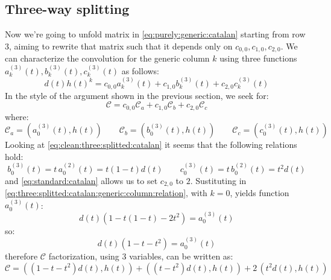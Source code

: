 \subsection{Three-way splitting}

Now we're going to unfold matrix in \autoref{eq:purely:generic:catalan} starting from row $3$,
aiming to rewrite that matrix such that it depends only on $c_{0,0}, c_{1,0}, c_{2,0}$.
We can characterize the convolution for the generic column $k$ using three
functions $a_{k}^{(3)}(t), b_{k}^{(3)}(t), c_{k}^{(3)}(t)$ as follows:
\begin{equation} 
    d(t)h(t)^{k} = c_{0,0}a_{k}^{(3)}(t) + c_{1,0}b_{k}^{(3)}(t) + c_{2,0}c_{k}^{(3)}(t)
    \label{eq:three:splitted:catalan:generic:column:relation}
\end{equation} 
In the style of the argument shown in the previous section, we seek for:
\begin{equation} 
    \mathcal{C} = c_{0,0}\mathcal{C}_{a} + c_{1,0}\mathcal{C}_{b} + c_{2,0}\mathcal{C}_{c}
    \label{eq:three:splitted:catalan:riordan:expansion}
\end{equation} 
where:
\begin{displaymath} 
    \mathcal{C}_{a} = \left(a_{0}^{(3)}(t), h(t)\right) \quad \quad 
    \mathcal{C}_{b} = \left(b_{0}^{(3)}(t), h(t)\right) \quad \quad 
    \mathcal{C}_{c} = \left(c_{0}^{(3)}(t), h(t)\right) \quad \quad 
\end{displaymath} 
Looking at \autoref{eq:clean:three:splitted:catalan} it seems that the following relations hold:
\begin{displaymath} 
    b_{0}^{(3)}(t) = t\,a_{0}^{(2)}(t) = t(1-t)d(t)\quad \quad 
    c_{0}^{(3)}(t) = t\,b_{0}^{(2)}(t) = t^{2}d(t) 
\end{displaymath} 
and \autoref{eq:standard:catalan} allows us to set $c_{2,0}$ to $2$. Sustituting in
\autoref{eq:three:splitted:catalan:generic:column:relation}, with $k=0$, yields
function $a_{0}^{(3)}(t)$:
\begin{displaymath} 
    d(t)\left(1 -t(1-t) -2t^{2}\right) = a_{0}^{(3)}(t)
\end{displaymath} 
so:
\begin{displaymath} 
    d(t)\left(1 -t -t^{2}\right) = a_{0}^{(3)}(t)
\end{displaymath} 
therefore $\mathcal{C}$ factorization, using $3$ variables, can be written as:
\begin{displaymath} 
    \mathcal{C} = 
        \left(\left(1 -t -t^{2}\right)d(t), h(t)\right) +
        \left(\left(t-t^{2}\right)d(t), h(t)\right) +
        2\,\left(t^{2}d(t), h(t)\right) 
\end{displaymath} 
